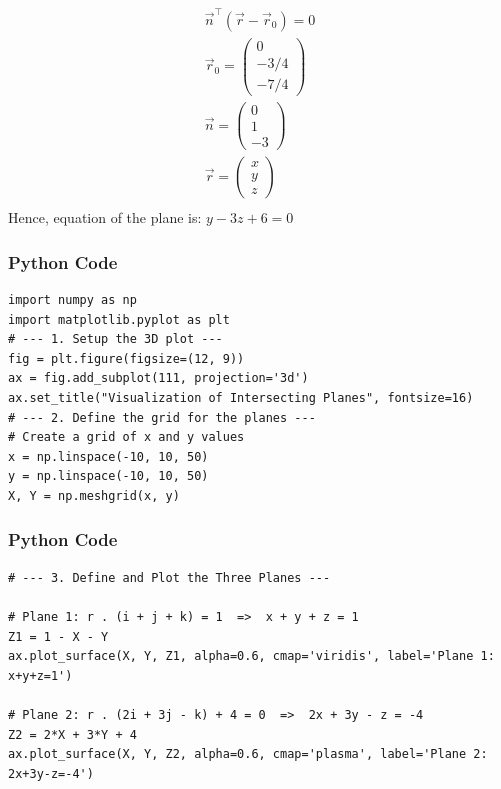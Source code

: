 \documentclass{beamer}
\begin{document}
\begin{frame}
\begin{align}
\vec{n}^\top (\vec{r} - \vec{r}_0) = 0\\
\vec{r}_0 = \begin{pmatrix} 0 \\ -3/4 \\ -7/4 \end{pmatrix}\\
\vec{n} = \begin{pmatrix}0 \\1 \\-3\end{pmatrix}\\
\vec{r} = \begin{pmatrix}x \\y \\z\end{pmatrix}\\
\end{align}
Hence, equation of the plane is: $y - 3z + 6 = 0$ 

\end{frame}


\begin{frame}[fragile]
\frametitle{Python Code}
\begin{lstlisting}
import numpy as np
import matplotlib.pyplot as plt
# --- 1. Setup the 3D plot ---
fig = plt.figure(figsize=(12, 9))
ax = fig.add_subplot(111, projection='3d')
ax.set_title("Visualization of Intersecting Planes", fontsize=16)
# --- 2. Define the grid for the planes ---
# Create a grid of x and y values
x = np.linspace(-10, 10, 50)
y = np.linspace(-10, 10, 50)
X, Y = np.meshgrid(x, y)
\end{lstlisting}
\end{frame}

\begin{frame}[fragile]
\frametitle{Python Code}
\begin{lstlisting}
# --- 3. Define and Plot the Three Planes ---

# Plane 1: r . (i + j + k) = 1  =>  x + y + z = 1
Z1 = 1 - X - Y
ax.plot_surface(X, Y, Z1, alpha=0.6, cmap='viridis', label='Plane 1: x+y+z=1')

# Plane 2: r . (2i + 3j - k) + 4 = 0  =>  2x + 3y - z = -4
Z2 = 2*X + 3*Y + 4
ax.plot_surface(X, Y, Z2, alpha=0.6, cmap='plasma', label='Plane 2: 2x+3y-z=-4')
\end{lstlisting}
\end{frame}
\end{document}
